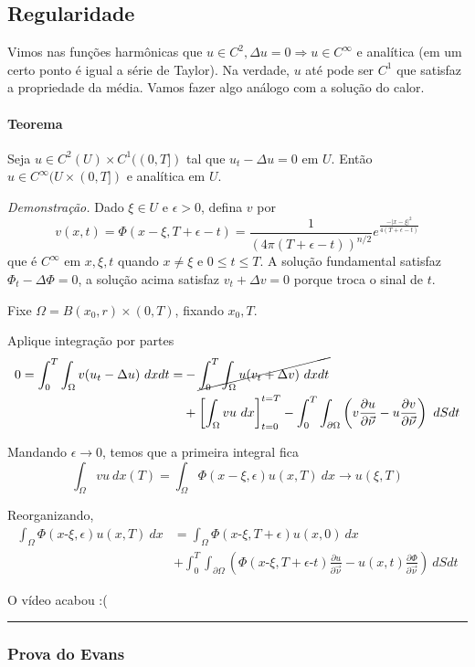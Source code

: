 \documentclass[11pt]{article}
\newcommand{\p}{\partial}
\newcommand{\e}{\epsilon}
\newcommand{\pde}[2]{\frac{\p #1}{\p #2}}
\newcommand{\dirdev}[1]{\pde{#1}{\vec{\nu}}}
\newcommand{\mi}{\text{-}}
\begin{document}
\subsection{Regularidade}
Vimos nas funções harmônicas que \(u\in C^2, \Delta u =0 \Rightarrow u \in C^\infty \) e analítica (em um certo ponto é igual a série de Taylor). Na verdade, \(u\) até pode ser \(C^1\) que satisfaz a propriedade da média. Vamos fazer algo análogo com a solução do calor.

\paragraph{Teorema} Seja \(u \in C^2 (U) \times C^1((0,T])\) tal que \(u_t - \Delta u =0 \) em \(U\). Então \(u \in C^\infty(U \times (0,T])\) e analítica em \(U\).

\textit{Demonstração.} Dado \(\xi \in U\) e \(\e>0\), defina \(v\) por \[v(x,t) = \Phi(x - \xi, T+\e-t) = \frac{1}{\left(4\pi(T+\e-t)\right)^{n/2}}e^{\frac{-|x-\xi|^2}{4(T+\e-t)}}\]que é \(C^\infty\) em \(x, \xi, t\) quando \(x\neq\xi\) e \(0\leq t \leq T\).
A solução fundamental satisfaz \(\Phi_t - \Delta\Phi =0 \), a solução acima satisfaz \(v_t + \Delta v =0 \) porque troca o sinal de \(t\).

Fixe \(\Omega = B(x_0, r)\times(0,T)\), fixando \(x_0, T\).

 Aplique integração por partes \begin{align*}
	0 = \int_0^T\int_\Omega v (u_t - \Delta u)\ dxdt = &- \cancel{\int_0^T\int_\Omega u(v_t + \Delta v)\ dxdt} \\ &+ \left[\int_\Omega vu\ dx\right]^{t=T}_{t=0} - \int_0^T \int_{\p\Omega} \left(v \dirdev{u} - u\dirdev{v}\right)\ dSdt
\end{align*}

Mandando \(\e \rightarrow 0\), temos que a primeira integral fica \[
	\int_\Omega  vu\ dx (T) = \int_\Omega\Phi(x-\xi, \e) u(x,T)\ dx \rightarrow u(\xi, T)\]
	
Reorganizando, \begin{align*}
	 \int_\Omega\Phi(x\mi \xi, \e) u(x,T)\ dx &=  \int_\Omega\Phi(x\mi \xi, T+\e) u(x,0)\ dx  \\ &+  \int_0^T \int_{\p\Omega} \left(\Phi(x\mi \xi, T+\e\mi t) \dirdev{u} - u(x,t)\dirdev{\Phi}\right)\ dSdt
\end{align*}

O vídeo acabou :(

\hrule

\subsubsection*{Prova do Evans}
\end{document}
